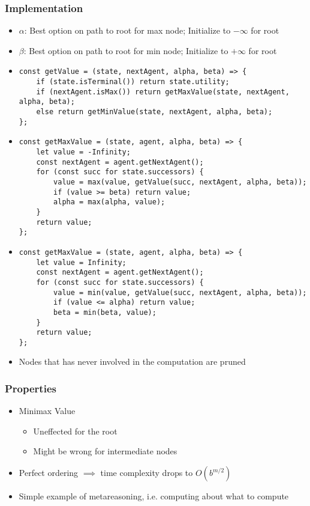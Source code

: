 \subsubsection*{Implementation}
\begin{itemize}
    \item $\alpha$: Best option on path to root for max node; Initialize to $-\infty$ for root
    \item $\beta$: Best option on path to root for min node; Initialize to $+\infty$ for root
    \item {}
    \linespread{1.1}
    \begin{verbatim}
const getValue = (state, nextAgent, alpha, beta) => {
    if (state.isTerminal()) return state.utility;
    if (nextAgent.isMax()) return getMaxValue(state, nextAgent, alpha, beta);
    else return getMinValue(state, nextAgent, alpha, beta);
};
    \end{verbatim}
    \linespread{1.6}
    \item {}
    \linespread{1.1}
    \begin{verbatim}
const getMaxValue = (state, agent, alpha, beta) => {
    let value = -Infinity;
    const nextAgent = agent.getNextAgent();
    for (const succ for state.successors) {
        value = max(value, getValue(succ, nextAgent, alpha, beta));
        if (value >= beta) return value;
        alpha = max(alpha, value);
    }
    return value;
};
    \end{verbatim}
    \linespread{1.6}
    \item {}
    \linespread{1.1}
    \begin{verbatim}
const getMaxValue = (state, agent, alpha, beta) => {
    let value = Infinity;
    const nextAgent = agent.getNextAgent();
    for (const succ for state.successors) {
        value = min(value, getValue(succ, nextAgent, alpha, beta));
        if (value <= alpha) return value;
        beta = min(beta, value);
    }
    return value;
};
    \end{verbatim}
    \linespread{1.6}
    \item Nodes that has never involved in the computation are pruned
\end{itemize}

\subsubsection*{Properties}
\begin{itemize}
    \item Minimax Value
    \begin{itemize}
        \item Uneffected for the root
        \item Might be wrong for intermediate nodes
    \end{itemize}
    \item Perfect ordering $\implies$ time complexity drops to $O(b^{m/2})$
    \item Simple example of metareasoning, i.e. computing about what to compute
\end{itemize}

